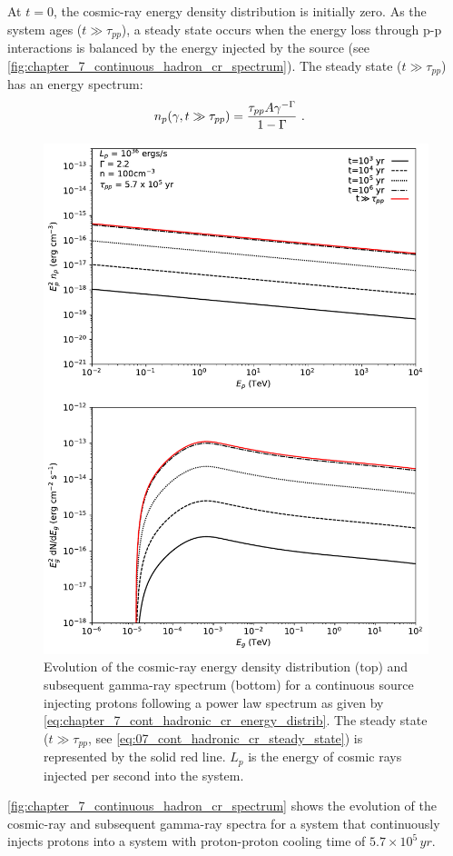 At $t=0$, the cosmic-ray energy density distribution is initially zero. As the system ages ($t\gg\tau_{pp}$), a steady state occurs when the energy loss through p-p interactions is balanced by the energy injected by the source (see \autoref{fig:chapter_7_continuous_hadron_cr_spectrum}). The steady state ($t\gg \tau_{pp}$) has an energy spectrum:
\begin{equation}
    \begin{aligned}
    	n_p\qty(\gamma, t\gg \tau_{pp})&=\frac{\tau_{pp}A\gamma^{-\Gamma}}{1-\Gamma}\text{ .}
    \end{aligned} \label{eq:07_cont_hadronic_cr_steady_state}
\end{equation}
\begin{figure}[hbtp]
	\centering
	\includegraphics[width=1.0\textwidth]{07_Particle_Evolution/Images/evolution/continuous_proton_total_spectrum.pdf}
	\caption{Evolution of the cosmic-ray energy density distribution (top) and subsequent gamma-ray spectrum (bottom) for a continuous source injecting protons following a power law spectrum as given by \autoref{eq:chapter_7_cont_hadronic_cr_energy_distrib}. The steady state ($t\gg \tau_{pp}$, see \autoref{eq:07_cont_hadronic_cr_steady_state}) is represented by the solid red line. $L_p$ is the energy of cosmic rays injected per second into the system.}
	\label{fig:chapter_7_continuous_hadron_cr_spectrum}
\end{figure}
\autoref{fig:chapter_7_continuous_hadron_cr_spectrum} shows the evolution of the cosmic-ray and subsequent gamma-ray spectra for a system that continuously injects protons into a system with proton-proton cooling time of $5.7\times 10^5\,\si{yr}$.

